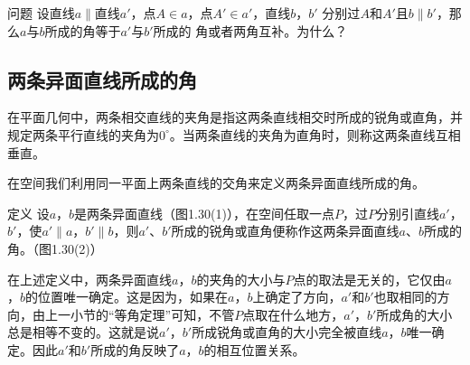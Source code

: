 \begin{blk}{问题}
  设直线$a\parallel$直线$a'$，点$A\in a$，点$A'\in a'$，直线$b$，$b'$
分别过$A$和$A'$且$b\parallel b'$，那么$a$与$b$所成的角等于$a'$与$b'$所成的
角或者两角互补。为什么？
\end{blk}

\subsection{两条异面直线所成的角}
在平面几何中，两条相交直线的夹角是指这两条直线相交时所成的锐角或直角，并规定两条平行直线的夹角为$0^{\circ}$。当两条直线的夹角为直角时，则称这两条直线互相垂直。

在空间我们利用同一平面上两条直线的交角来定义两条异面直线所成的角。

\begin{blk}
  {定义} 设$a$，$b$是两条异面直线（图1.30(1)），在空间任取一点$P$，过$P$分别引直线$a'$，$b'$，使$a'\parallel a$，$b'\parallel b$，则$a'$、$b'$所成的锐角或直角便称作这两条异面直线$a$、$b$所成的角。（图1.30(2)）
\end{blk}

\begin{figure}[htp]
  \centering
  \caption{}
\end{figure}

在上述定义中，两条异面直线$a$，$b$的夹角的大小与$P$点的取法是无关的，它仅由$a$，$b$的位置唯一确定。这是因为，如果在$a$，$b$上确定了方向，$a'$和$b'$也取相同的方向，由上一小节的“等角定理”可知，不管$P$点取在什么地方，$a'$，$b'$所成角的大小总是相等不变的。这就是说$a'$，$b'$所成锐角或直角的大小完全被直线$a$，$b$唯一确定。因此$a'$和$b'$所成的角反映了$a$，$b$的相互位置关系。

